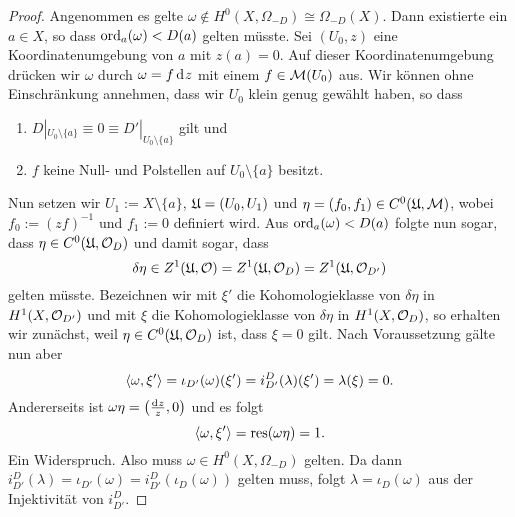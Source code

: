\begin{proof}
  Angenommen es gelte $\omega \notin H^0(X, \Omega_{-D}) \cong
  \Omega_{-D}(X)$. Dann existierte ein $a \in X$, so dass
  $\operatorname{ord}_a(\omega) < D(a)$ gelten müsste. Sei $(U_0, z)$ eine Koordinatenumgebung
  von $a$ mit $z(a) = 0$. Auf dieser Koordinatenumgebung drücken wir
  $\omega$ durch $\omega = f \d[z]$ mit einem $f \in \mathcal{M}(U_0)$
  aus. Wir können ohne Einschränkung annehmen, dass wir $U_0$ klein
  genug gewählt haben, so dass
  \begin{enumerate}
  \item $D|_{U_0 \setminus \{a\}} \equiv 0 \equiv D'|_{U_0 \setminus
      \{a\}}$ gilt und
  \item $f$ keine Null- und Polstellen auf $U_0 \setminus \{a\}$ besitzt.
  \end{enumerate}
  Nun setzen wir $U_1 := X \setminus \{a\}$, $\mathfrak{U} = (U_0, U_1)$ und
  $\eta = (f_0, f_1) \in C^0(\mathfrak{U}, \mathcal{M})$, wobei $f_0 := (zf)^{-1}$ und
  $f_1 := 0$ definiert wird. Aus $\operatorname{ord}_a(\omega) < D(a)$ folgte nun
  sogar, dass $\eta \in C^0(\mathfrak{U}, \mathcal{O}_D)$ und damit sogar, dass
  \[
  \delta \eta \in Z^1(\mathfrak{U}, \mathcal{O}) = Z^1(\mathfrak{U}, \mathcal{O}_D) = Z^1(\mathfrak{U},
  \mathcal{O}_{D'})
  \]
  gelten müsste. Bezeichnen wir mit $\xi'$ die
  Kohomologieklasse von $\delta \eta$ in $H^1(X, \mathcal{O}_{D'})$ und mit
  $\xi$ die Kohomologieklasse von $\delta \eta$ in $H^1(X, \mathcal{O}_D)$,
  so erhalten wir zunächst, weil $\eta \in C^0(\mathfrak{U}, \mathcal{O}_D)$ ist, dass
  $\xi = 0$ gilt. Nach Voraussetzung gälte nun aber
  \[
  \langle \omega, \xi' \rangle = \iota_{D'}(\omega)(\xi') =
  i_{D'}^D(\lambda)(\xi') = \lambda(\xi) = 0.
  \]
  Andererseits ist $\omega \eta = \left ( \frac{\d[z]}{z}, 0 \right )$
  und es folgt
  \[
  \langle \omega, \xi' \rangle = \operatorname{res}(\omega \eta) = 1.
  \]
  Ein Widerspruch. Also muss $\omega \in H^0(X, \Omega_{-D})$
  gelten. Da dann $i_{D'}^D(\lambda) = \iota_{D'}(\omega) =
  i_{D'}^D(\iota_D(\omega))$ gelten muss, folgt $\lambda =
  \iota_D(\omega)$ aus der Injektivität von $i_{D'}^D$.
\end{proof}

